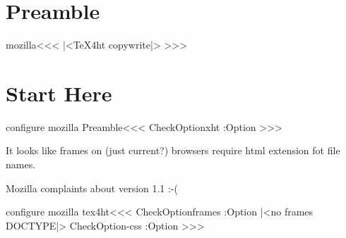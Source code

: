 %


\ifx \HTML\UnDef
   \def\HTML{mozilla}                   
   \def\CONFIG{\jobname}
   \def\MAKETITLE{\author{Eitan M. Gurari}}         
   \def\next{  \endinput}
   \expandafter\next
\fi




\chapter{Preamble}

\<mozilla\><<<
|<TeX4ht copywrite|>
>>>

  



\chapter{Start Here}

\<configure mozilla Preamble\><<<
\:CheckOption{xht} \if:Option 
\else
\fi
>>>

It looks like frames on (just current?) browsers require
html extension fot file names.

Mozilla complaints about version 1.1 :-(



\<configure mozilla tex4ht\><<<
\:CheckOption{frames}  \if:Option
\else
  |<no frames DOCTYPE|>
\fi
\:CheckOption{-css} \if:Option \else
    {}
\fi
>>>


